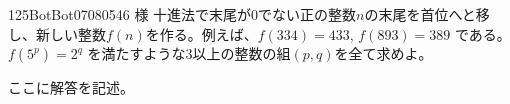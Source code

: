 \begin{thm}{125}{}{BotBot07080546 様}
 十進法で末尾が0でない正の整数$n$の末尾を首位へと移し、新しい整数$f(n)$を作る。例えば、$f(334)=433$, $f(893)=389$ である。$f(5^p)=2^q$ を満たすような3以上の整数の組$(p,q)$を全て求めよ。
\end{thm}

ここに解答を記述。
